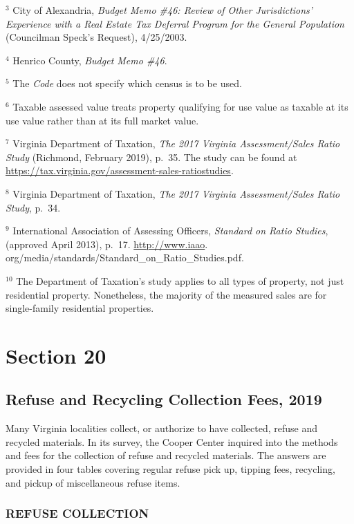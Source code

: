 \documentclass[
]{book}
\begin{document}
\(^3\) City of Alexandria, \emph{Budget Memo \#46: Review of Other Jurisdictions' Experience with a Real Estate Tax Deferral Program for the General Population} (Councilman Speck's Request), 4/25/2003.

\(^4\) Henrico County, \emph{Budget Memo \#46}.

\(^5\) The \emph{Code} does not specify which census is to be used.

\(^6\) Taxable assessed value treats property qualifying for use value
as taxable at its use value rather than at its full market value.

\(^7\) Virginia Department of Taxation, \emph{The 2017 Virginia Assessment/Sales Ratio Study} (Richmond, February 2019), p.~35. The study
can be found at \url{https://tax.virginia.gov/assessment-sales-ratiostudies}.

\(^8\) Virginia Department of Taxation, \emph{The 2017 Virginia Assessment/Sales Ratio Study}, p.~34.

\(^9\) International Association of Assessing Officers, \emph{Standard on Ratio Studies}, (approved April 2013), p.~17. \url{http://www.iaao}.
org/media/standards/Standard\_on\_Ratio\_Studies.pdf.

\(^10\) The Department of Taxation's study applies to all types of property, not just residential property. Nonetheless, the majority of
the measured sales are for single-family residential properties.

\hypertarget{section-20}{%
\chapter{Section 20}\label{section-20}}

\hypertarget{refuse-and-recycling-collection-fees-2019}{%
\section{Refuse and Recycling Collection Fees, 2019}\label{refuse-and-recycling-collection-fees-2019}}

Many Virginia localities collect, or authorize to have collected, refuse and recycled materials. In its survey, the Cooper Center inquired into the methods and fees for the collection of refuse and recycled materials. The answers are provided in four tables covering regular refuse pick up, tipping fees, recycling, and pickup of miscellaneous refuse items.

\hypertarget{refuse-collection}{%
\subsection{REFUSE COLLECTION}\label{refuse-collection}}
\end{document}
